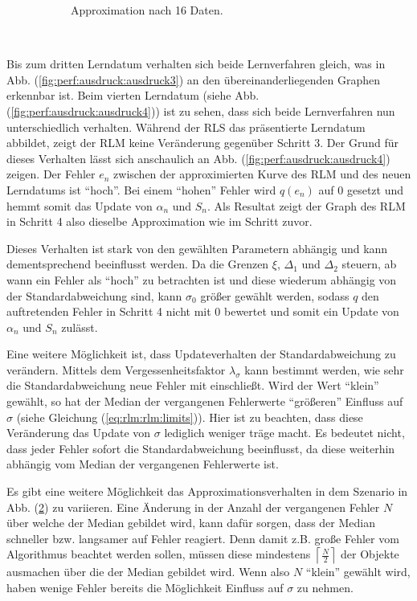 \documentclass[a4paper, 12pt]{article}
\begin{document}
{\begin{figure}[H]
\begin{subfigure}[b]{0.4\textwidth}
    \caption{Approximation nach 16 Daten.}
    \label{fig:perf:ausdruck:ausdruck16}
  \end{subfigure}
  \\
  \caption{}
  \label{fig:perf:ausdruck:approx}
\end{figure}
Bis zum dritten Lerndatum verhalten sich beide Lernverfahren gleich, was in Abb. (\ref{fig:perf:ausdruck:ausdruck3}) an den übereinanderliegenden Graphen erkennbar ist. Beim vierten Lerndatum (siehe Abb. (\ref{fig:perf:ausdruck:ausdruck4})) ist zu sehen, dass sich beide Lernverfahren nun unterschiedlich verhalten. Während der RLS das präsentierte Lerndatum abbildet, zeigt der RLM keine Veränderung gegenüber Schritt 3. Der Grund für dieses Verhalten lässt sich anschaulich an Abb. (\ref{fig:perf:ausdruck:ausdruck4}) zeigen. Der Fehler $e_n$ zwischen der approximierten Kurve des RLM und des neuen Lerndatums ist "`hoch"'. Bei einem "`hohen"' Fehler wird $q(e_n)$ auf 0 gesetzt und hemmt somit das Update von $\alpha_n$ und $S_n$. Als Resultat zeigt der Graph des RLM in Schritt 4 also dieselbe Approximation wie im Schritt zuvor.

Dieses Verhalten ist stark von den gewählten Parametern abhängig und kann dementsprechend beeinflusst werden. Da die Grenzen $\xi$, $\Delta_1$ und $\Delta_2$ steuern, ab wann ein Fehler als "`hoch"' zu betrachten ist und diese wiederum abhängig von der Standardabweichung sind, kann  $\sigma_0$ größer gewählt werden, sodass $q$ den auftretenden Fehler in Schritt 4 nicht mit 0 bewertet und somit ein Update von $\alpha_n$ und $S_n$ zulässt.

Eine weitere Möglichkeit ist, dass Updateverhalten der Standardabweichung zu verändern. Mittels dem Vergessenheitsfaktor $\lambda_\sigma$ kann bestimmt werden, wie sehr die Standardabweichung neue Fehler mit einschließt. Wird der Wert "`klein"' gewählt, so hat der Median der vergangenen Fehlerwerte "`größeren"' Einfluss auf $\sigma$ (siehe Gleichung (\ref{eq:rlm:rlm:limits})). Hier ist zu beachten, dass diese Veränderung das Update von $\sigma$ lediglich weniger träge macht. Es bedeutet nicht, dass jeder Fehler sofort die Standardabweichung beeinflusst, da diese weiterhin abhängig vom Median der vergangenen Fehlerwerte ist.

Es gibt eine weitere Möglichkeit das Approximationsverhalten in dem Szenario in Abb. (\ref{fig:perf:ausdruck:approx}) zu variieren. Eine Änderung in der Anzahl der vergangenen Fehler $N$ über welche der Median gebildet wird, kann dafür sorgen, dass der Median schneller bzw. langsamer auf Fehler reagiert. Denn damit z.B. große Fehler vom Algorithmus beachtet werden sollen, müssen diese mindestens $\left\lceil \frac{N}{2} \right\rceil$ der Objekte ausmachen über die der Median gebildet wird. Wenn also $N$ "`klein"' gewählt wird, haben wenige Fehler bereits die Möglichkeit Einfluss auf $\sigma$ zu nehmen.

}
\end{document}
